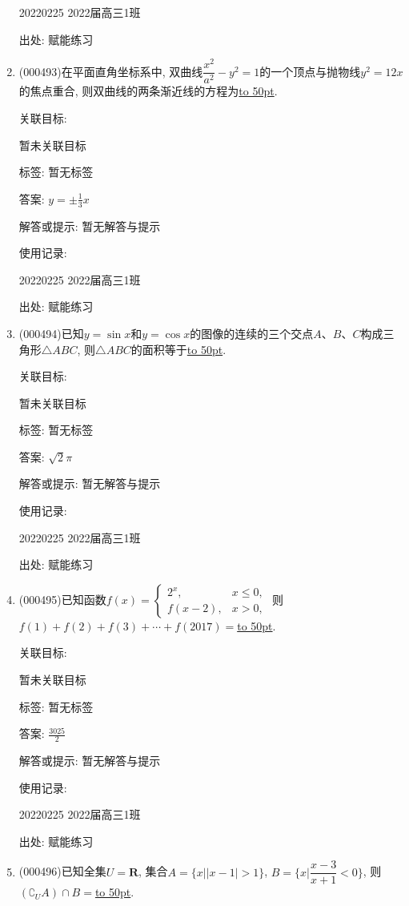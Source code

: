\documentclass[10pt,a4paper]{article}
\newcommand{\blank}[1]{\underline{\hbox to #1pt{}}}
\begin{document}
\begin{enumerate}[1.]
20220225	2022届高三1班	


出处: 赋能练习
\item { (000493)}在平面直角坐标系中, 双曲线$\dfrac{x^2}{a^2}-y^2=1 $的一个顶点与抛物线$y^2=12x$的焦点重合, 则双曲线的两条渐近线的方程为\blank{50}.


关联目标:

暂未关联目标



标签: 暂无标签

答案: $y=\pm \frac 13x$

解答或提示: 暂无解答与提示

使用记录:

20220225	2022届高三1班	


出处: 赋能练习
\item { (000494)}已知$y=\sin x$和$y=\cos x$的图像的连续的三个交点$A$、$B$、$C$构成三角形$\triangle ABC$, 则$\triangle ABC$的面积等于\blank{50}.


关联目标:

暂未关联目标



标签: 暂无标签

答案: $\sqrt 2\pi$

解答或提示: 暂无解答与提示

使用记录:

20220225	2022届高三1班	


出处: 赋能练习
\item { (000495)}已知函数$f(x)=\begin{cases} 2^x, & x\le 0, \\ f(x-2), & x>0, \end{cases}$ 则$f(1)+f(2)+f(3)+\cdots+f(2017)=$\blank{50}.


关联目标:

暂未关联目标



标签: 暂无标签

答案: $\frac{3025}2$

解答或提示: 暂无解答与提示

使用记录:

20220225	2022届高三1班	


出处: 赋能练习
\item { (000496)}已知全集$U=\mathbf{R}$, 集合$A=\{x||x-1|>1\}$, $B=\{x|\dfrac{x-3}{x+1}<0\}$, 则$(\complement_U A)\cap B=$\blank{50}.



\end{enumerate}
\end{document}
